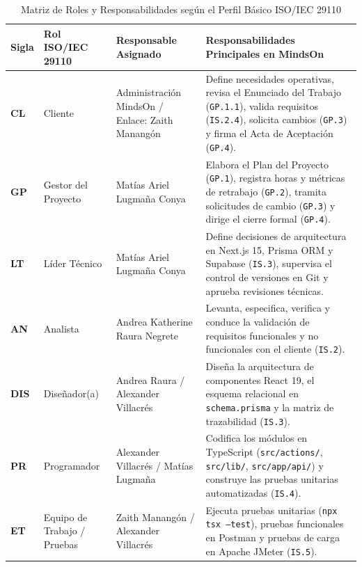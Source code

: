 \documentclass[11pt,a4paper]{article}
\begin{document}
\begin{table}[h!]
\centering
\caption{Matriz de Roles y Responsabilidades según el Perfil Básico ISO/IEC 29110}
\label{tab:roles}
\renewcommand{\arraystretch}{1.25}
\begin{tabular}{@{}p{1.2cm}p{3.4cm}p{4.3cm}p{6.8cm}@{}}
\toprule
\rowcolor{tableHeader}
\textbf{Sigla} & \textbf{Rol ISO/IEC 29110} & \textbf{Responsable Asignado} & \textbf{Responsabilidades Principales en MindsOn} \\
\midrule
\textbf{CL} & Cliente & Administración MindsOn / Enlace: Zaith Manangón & Define necesidades operativas, revisa el Enunciado del Trabajo (\texttt{GP.1.1}), valida requisitos (\texttt{IS.2.4}), solicita cambios (\texttt{GP.3}) y firma el Acta de Aceptación (\texttt{GP.4}). \\
\textbf{GP} & Gestor del Proyecto & Matías Ariel Lugmaña Conya & Elabora el Plan del Proyecto (\texttt{GP.1}), registra horas y métricas de retrabajo (\texttt{GP.2}), tramita solicitudes de cambio (\texttt{GP.3}) y dirige el cierre formal (\texttt{GP.4}). \\
\textbf{LT} & Líder Técnico & Matías Ariel Lugmaña Conya & Define decisiones de arquitectura en Next.js 15, Prisma ORM y Supabase (\texttt{IS.3}), supervisa el control de versiones en Git y aprueba revisiones técnicas. \\
\textbf{AN} & Analista & Andrea Katherine Raura Negrete & Levanta, especifica, verifica y conduce la validación de requisitos funcionales y no funcionales con el cliente (\texttt{IS.2}). \\
\textbf{DIS} & Diseñador(a) & Andrea Raura / Alexander Villacrés & Diseña la arquitectura de componentes React 19, el esquema relacional en \texttt{schema.prisma} y la matriz de trazabilidad (\texttt{IS.3}). \\
\textbf{PR} & Programador & Alexander Villacrés / Matías Lugmaña & Codifica los módulos en TypeScript (\texttt{src/actions/}, \texttt{src/lib/}, \texttt{src/app/api/}) y construye las pruebas unitarias automatizadas (\texttt{IS.4}). \\
\textbf{ET} & Equipo de Trabajo / Pruebas & Zaith Manangón / Alexander Villacrés & Ejecuta pruebas unitarias (\texttt{npx tsx --test}), pruebas funcionales en Postman y pruebas de carga en Apache JMeter (\texttt{IS.5}). \\
\bottomrule
\end{tabular}
\end{table}

\end{document}
